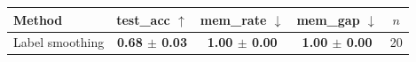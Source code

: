 \begin{tabular}{lcccc}
\toprule
Method & test\_acc $\uparrow$ & mem\_rate $\downarrow$ & mem\_gap $\downarrow$ & $n$ \\
\midrule
Label smoothing & \textbf{0.68 $\pm$ 0.03} & \textbf{1.00 $\pm$ 0.00} & \textbf{1.00 $\pm$ 0.00} & 20 \\
\bottomrule
\end{tabular}

